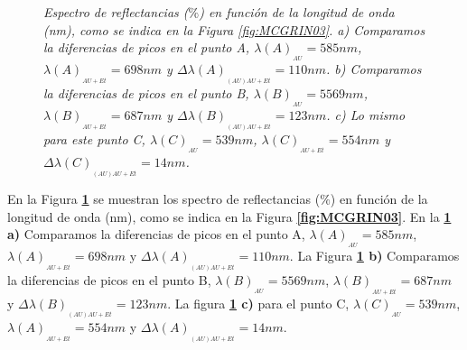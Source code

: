 \documentclass[a4paper,11pt,]{book}
\begin{document}
\begin{figure}[H]
	\caption{\emph{Espectro de reflectancias ($\%$) en función de la longitud de onda (nm), como se indica en la Figura \ref{fig:MCGRIN03}. a) Comparamos la diferencias de picos en el punto A, $ \lambda(A)_{_{AU}}=585 nm$,  $ \lambda(A)_{_{AU+Et}}=698 nm$ y  $\Delta \lambda(A)_{_{(AU)AU+Et}}=110 nm$. b) Comparamos la diferencias de picos en el punto B,  $ \lambda(B)_{_{AU}}=5569 nm$,  $ \lambda(B)_{_{AU+Et}}=687 nm$ y  $\Delta \lambda(B)_{_{(AU)AU+Et}}=123 nm$.  c) Lo mismo para este punto C,  $ \lambda(C)_{_{AU}}=539 nm$,  $ \lambda(C)_{_{AU+Et}}=554 nm$ y  $\Delta \lambda(C)_{_{(AU)AU+Et}}=14 nm$.  }}
	\label{fig:MCGRIN8}
\end{figure}
En la Figura \textbf{\ref{fig:MCGRIN8}} se muestran los spectro de reflectancias ($\%$) en función de la longitud de onda (nm), como se indica en la Figura \textbf{\ref{fig:MCGRIN03}}. En la \textbf{\ref{fig:MCGRIN8} a)} Comparamos la diferencias de picos en el punto A, $ \lambda(A)_{_{AU}}=585 nm$,  $ \lambda(A)_{_{AU+Et}}=698 nm$ y  $\Delta \lambda(A)_{_{(AU)AU+Et}}=110 nm$. La Figura \textbf{\ref{fig:MCGRIN8} b)} Comparamos la diferencias de picos en el punto B,  $ \lambda(B)_{_{AU}}=5569 nm$,  $ \lambda(B)_{_{AU+Et}}=687 nm$ y  $\Delta \lambda(B)_{_{(AU)AU+Et}}=123 nm$. La figura  \textbf{\ref{fig:MCGRIN8} c)} para el punto C,  $ \lambda(C)_{_{AU}}=539 nm$,  $ \lambda(A)_{_{AU+Et}}=554 nm$ y  $\Delta \lambda(A)_{_{(AU)AU+Et}}=14 nm$.
\end{document}
